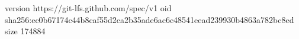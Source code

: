version https://git-lfs.github.com/spec/v1
oid sha256:ec0b67174c44b8caf55d2ca2b35ade6ac6c48541eead239930b4863a782bc8ed
size 174884
